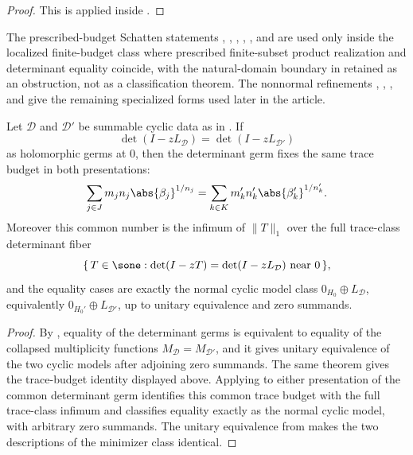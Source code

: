 \begin{proof}
  This is  applied inside
  .
\end{proof}

The prescribed-budget Schatten statements
,
,
,
,
, and
are used only inside the localized finite-budget class where prescribed
finite-subset product realization and determinant equality coincide, with
the natural-domain boundary in
 retained as an obstruction,
not as a classification theorem.  The nonnormal refinements
,
,
, and
give the remaining specialized forms used later in the article.

\begin{corollary}
  \label{cor:determinant-intrinsic-trace-budget}
  Let \(\mathcal D\) and \(\mathcal D'\) be summable cyclic data as in
  . If
  \[
    \det(I-zL_{\mathcal D})=\det(I-zL_{\mathcal D'})
  \]
  as holomorphic germs at \(0\), then the determinant germ fixes the same
  trace budget in both presentations:
  \[
    \sum_{j\in J}m_jn_j\abs{\beta_j}^{1/n_j}
    =
    \sum_{k\in K}m_k'n_k'\abs{\beta_k'}^{1/n_k'}.
  \]
  Moreover this common number is the infimum of \(\|T\|_1\) over the full
  trace-class determinant fiber
  \[
    \{\,T\in\sone:\det(I-zT)=\det(I-zL_{\mathcal D})\text{ near }0\,\},
  \]
  and the equality cases are exactly the normal cyclic model class
  \(0_{H_0}\oplus L_{\mathcal D}\), equivalently
  \(0_{H_0'}\oplus L_{\mathcal D'}\), up to unitary equivalence and zero
  summands.
\end{corollary}

\begin{proof}
  By , equality of the determinant
  germs is equivalent to equality of the collapsed multiplicity functions
  \(M_{\mathcal D}=M_{\mathcal D'}\), and it gives unitary equivalence of
  the two cyclic models after adjoining zero summands. The same theorem
  gives the trace-budget identity displayed above. Applying
   to either presentation of
  the common determinant germ identifies this common trace budget with the
  full trace-class infimum and classifies equality exactly as the normal
  cyclic model, with arbitrary zero summands. The unitary equivalence from
   makes the two descriptions of the
  minimizer class identical.
\end{proof}

